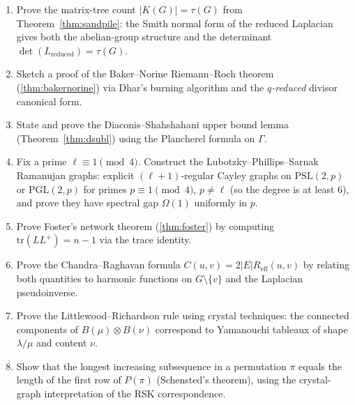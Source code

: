 \begin{enumerate}[resume]
\item Prove the matrix-tree count $|K(G)| = \tau(G)$ from
Theorem~\ref{thm:sandpile}: the Smith normal form of the reduced
Laplacian gives both the abelian-group structure and the determinant
$\det(L_{\text{reduced}}) = \tau(G)$.

\item Sketch a proof of the Baker--Norine Riemann--Roch theorem
(\ref{thm:bakernorine}) via Dhar's burning algorithm and the
\emph{$q$-reduced} divisor canonical form.

\item State and prove the Diaconis--Shahshahani upper bound lemma
(Theorem~\ref{thm:dsubl}) using the Plancherel formula on $\Gamma$.

\item Fix a prime $\ell \equiv 1 \pmod 4$. Construct the
Lubotzky--Phillips--Sarnak Ramanujan graphs: explicit
$(\ell+1)$-regular Cayley graphs on $\mathrm{PSL}(2, p)$ or
$\mathrm{PGL}(2, p)$ for primes $p \equiv 1 \pmod 4$, $p \ne \ell$
(so the degree is at least $6$), and prove they have spectral gap
$\Omega(1)$ uniformly in $p$.

\item Prove Foster's network theorem (\ref{thm:foster}) by computing
$\mathrm{tr}(L L^+) = n - 1$ via the trace identity.

\item Prove the Chandra--Raghavan formula $C(u, v) = 2|E| R_{\mathrm{eff}}(u, v)$
by relating both quantities to harmonic functions on $G \setminus \{v\}$
and the Laplacian pseudoinverse.

\item Prove the Littlewood--Richardson rule using crystal techniques: the
connected components of $B(\mu) \otimes B(\nu)$ correspond to
Yamanouchi tableaux of shape $\lambda / \mu$ and content $\nu$.

\item Show that the longest increasing subsequence in a permutation $\pi$
equals the length of the first row of $P(\pi)$ (Schensted's theorem),
using the crystal-graph interpretation of the RSK correspondence.
\end{enumerate}

